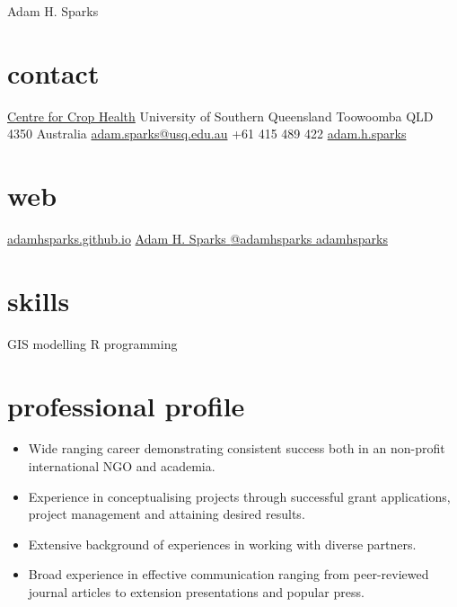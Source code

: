 
\hfill {\Huge Adam H. Sparks}
\begin{aside}
\small{\section{contact}}
\small{\href{http://www.usq.edu.au/research/research-at-usq/institutes-centres/cch}{Centre for Crop Health}}
\small{University of Southern Queensland}
\small{Toowoomba QLD 4350}
\small{Australia}
\small{\href{mailto:adam.sparks@usq.edu.au}{adam.sparks@usq.edu.au}}
\small{+61 415 489 422 \faMobilePhone{}}
\small{\href{skype:adam.h.sparks?call}{adam.h.sparks }}
\section{web}
\small{\href{https://adamhsparks.github.io}{adamhsparks.github.io}}
\small{\href{https://www.linkedin.com/in/adam-h-sparks-507b968}{Adam H. Sparks {\color{linkedin}\FA {}}}}
\small{\href{https://www.twitter.com/adamhsparks/}{@adamhsparks {\color{twitter.blue}\FA {}}}}
\small{\href{https://github.com/adamhsparks/}{adamhsparks \FA {}}}
\small{\section{skills}}
\small{GIS}
\small{modelling}
\small{R programming}
\end{aside}

\section*{professional profile}

\begin{itemize}
\setlength{\leftmargin}{0pt}
\item Wide ranging career demonstrating consistent success both in an non-profit international NGO and academia.
\item Experience in conceptualising projects through successful grant applications, project management and attaining desired results.
\item Extensive background of experiences in working with diverse partners.
\item Broad experience in effective communication ranging from peer-reviewed journal articles to extension presentations and popular press.
\end{itemize}


